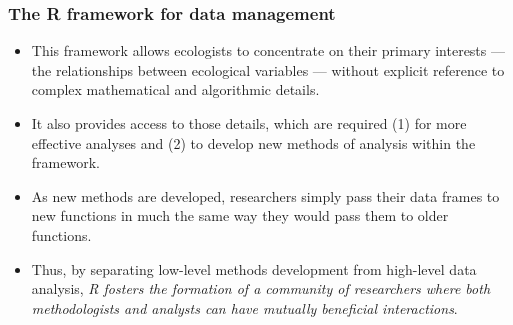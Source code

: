 \documentclass{beamer}
\numberwithin{exercise}{section}
\begin{document}
\begin{frame}
\frametitle{The R framework for data management}
\begin{center}
\vspace{-0.5cm}
\begin{block}{}
\begin{itemize}
\item This framework allows ecologists to concentrate on their primary interests \pause --- the relationships between ecological variables --- \pause without explicit reference to complex mathematical and algorithmic details.
\pause
\item It also provides access to those details, \pause which are required (1) \pause for more effective analyses and (2) \pause to develop new methods of analysis within the framework.
\pause
\item As new methods are developed, \pause researchers simply pass their data frames to new functions in much the same way they would pass them to older functions.
\pause
\item Thus, by separating low-level methods development from high-level data analysis, \pause \emph{R fosters the formation of a community of researchers where both methodologists and analysts can have mutually beneficial interactions}.
\end{itemize}
\end{block}
\end{center}
\end{frame}
\end{document}
